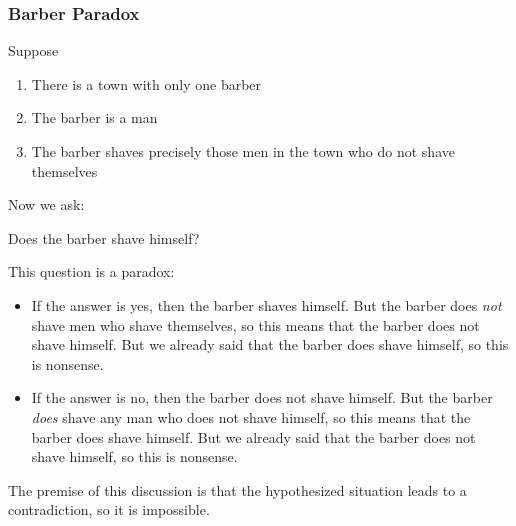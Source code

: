 \documentclass[../MATH-2000-Notes.tex]{subfiles}
\begin{document}
\subsubsection{Barber Paradox}
Suppose
\begin{enumerate}
    \item There is a town with only one barber
    \item The barber is a man
    \item The barber shaves precisely those men in the town who do not shave themselves
\end{enumerate}

Now we ask:
\begin{quotebox}
    Does the barber shave himself?
\end{quotebox}
This question is a paradox:
	\begin{itemize}
	\item If the answer is \textsf{yes}, then the barber shaves himself. But the barber does \emph{not} shave men who shave themselves, so this means that the barber does not shave himself. But we already said that the barber does shave himself, so this is nonsense.
	\item If the answer is \textsf{no}, then the barber does not shave himself. But the barber \emph{does} shave any man who does not shave himself, so this means that the barber does  shave himself. But we already said that the barber does not shave himself, so this is nonsense.
	\end{itemize}
The premise of this discussion is that the hypothesized situation leads to a contradiction, so it is impossible.
\end{document}
